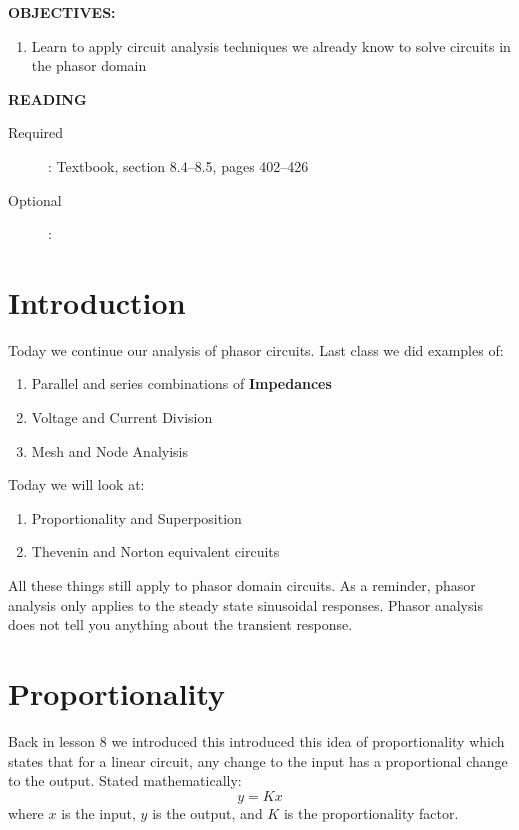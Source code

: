 \documentclass{handout}
\begin{document}
\maketitle

\textbf{OBJECTIVES:}
\begin{enumerate}
\item Learn to apply circuit analysis techniques we already know to solve circuits in the phasor domain
\end{enumerate}

\textbf{READING}
\begin{description}
\item [Required]:
Textbook, section 8.4--8.5, pages 402--426
\item [Optional]:
\end{description}

\section{Introduction}
Today we continue our analysis of phasor circuits.  Last class we did examples of:
\begin{enumerate}
\item Parallel and series combinations of \textbf{Impedances}
\item Voltage and Current Division
\item Mesh and Node Analyisis
\end{enumerate}

Today we will look at:
\begin{enumerate}
\item Proportionality and Superposition
\item Thevenin and Norton equivalent circuits
\end{enumerate}

All these things still apply to phasor domain circuits. As a reminder, phasor analysis only applies to the steady state sinusoidal responses.  Phasor analysis does not tell you anything about the transient response.


\section{Proportionality}
Back in lesson 8 we introduced this introduced this idea of proportionality which states that for a linear circuit, any change to the input has a proportional change to the output.  Stated mathematically:
\[
y=Kx
\]
where $x$ is the input, $y$ is the output, and $K$ is the proportionality factor.
\end{document}
